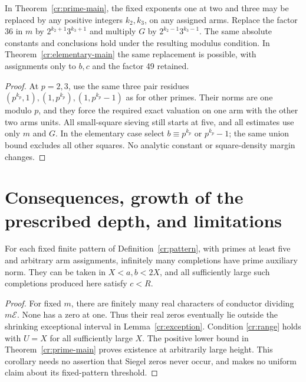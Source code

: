 \begin{corollary}
\label{cr:small-variants}
In Theorem~\ref{cr:prime-main}, the fixed exponents one at two and three may
be replaced by any positive integers $k_2,k_3$, on any assigned arms.
Replace the factor 36 in $m$ by $2^{k_2+1}3^{k_3+1}$ and multiply $G$ by
$2^{k_2-1}3^{k_3-1}$. The same absolute constants and conclusions hold under
the resulting modulus condition. In Theorem~\ref{cr:elementary-main} the
same replacement is possible, with assignments only to $b,c$ and the factor
49 retained.
\end{corollary}
\begin{proof}
At $p=2,3$, use the same three pair residues
$(p^{k_p},1),(1,p^{k_p}),(1,p^{k_p}-1)$ as for other primes.
Their norms are one modulo $p$, and they force the required exact valuation
on one arm with the other two arms units. All small-square sieving still
starts at five, and all estimates use only $m$ and $G$. In the elementary
case select $b\equiv p^{k_p}$ or $p^{k_p}-1$; the same union bound excludes
all other squares. No analytic constant or square-density margin changes.
\end{proof}

\section{Consequences, growth of the prescribed depth, and limitations}
\label{cr:consequences}
\begin{corollary}
\label{cr:fixed}
For each fixed finite pattern of Definition~\ref{cr:pattern}, with primes at
least five and arbitrary arm assignments, infinitely many completions have
prime auxiliary norm. They can be taken in $X<a,b<2X$, and all sufficiently
large such completions produced here satisfy $c<R$.
\end{corollary}
\begin{proof}
For fixed $m$, there are finitely many real characters of conductor dividing
$m\mathcal E$. None has a zero at one. Thus their real zeros eventually lie
outside the shrinking exceptional interval in Lemma~\ref{cr:exception}.
Condition \eqref{cr:range} holds with $U=X$ for all sufficiently large $X$.
The positive lower bound in Theorem~\ref{cr:prime-main} proves existence at
arbitrarily large height. This corollary needs no assertion that Siegel zeros
never occur, and makes no uniform claim about its fixed-pattern threshold.
\end{proof}

